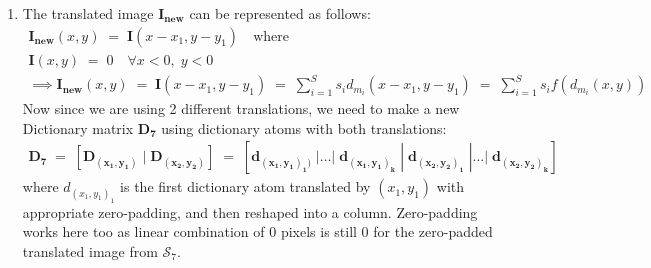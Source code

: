 \documentclass[11pt]{article}
\begin{document}
\begin{enumerate}
\begin{enumerate}
    \item The translated image $\mathbf{I_{new}}$ can be represented as follows:
    \begin{gather}
        \mathbf{I_{new}}(x,y)\;=\;\mathbf{I}(x-x_1,y-y_1)\quad\text{where}\\
        \mathbf{I}(x,y)\;=\;0\quad\forall x<0,\;y<0\nonumber\\
        \implies\mathbf{I_{new}}(x,y)\;=\;\mathbf{I}(x-x_1,y-y_1)\;=\;\sum_{i=1}^Ss_id_{m_i}(x-x_1,y-y_1)\;=\;\sum_{i=1}^Ss_if(d_{m_i}(x,y))
    \end{gather}
    Now since we are using 2 different translations, we need to make a new Dictionary matrix $\mathbf{D_7}$ using dictionary atoms with both translations:
    \begin{gather}
        \mathbf{D_7}\;=\;[\mathbf{D_{(x_1,y_1)}}\;|\;\mathbf{D_{(x_2,y_2)}}]\;=\;[\mathbf{d_{(x_1,y_1)_1)}}\;|\dots|\;\mathbf{d_{(x_1,y_1)_k}}\;|\;\mathbf{d_{(x_2,y_2)_1}}\;|\dots|\;\mathbf{d_{(x_2,y_2)_k}}]
    \end{gather}
    where $d_{{(x_1,y_1)}_1}$ is the first dictionary atom translated by $(x_1,y_1)$ with appropriate zero-padding, and then reshaped into a column. Zero-padding works here too as linear combination of 0 pixels is still 0 for the zero-padded translated image from $\mathcal{S}_7$.
\end{enumerate}



\end{enumerate}
\end{document}
